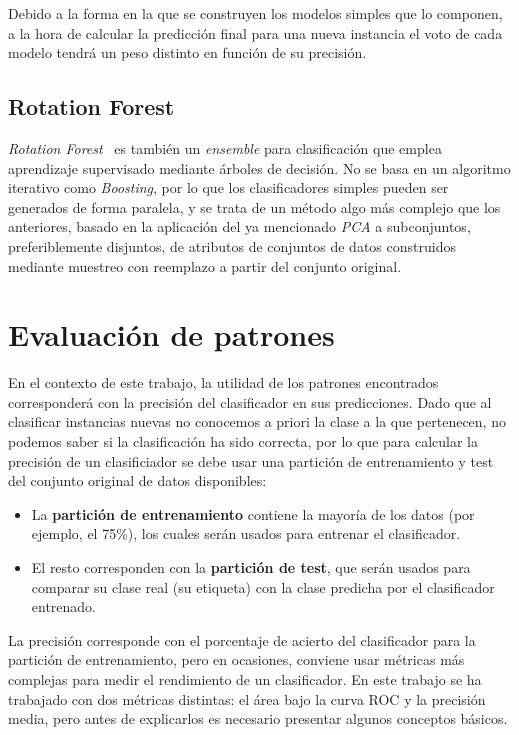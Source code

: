 Debido a la forma en la que se construyen los modelos simples que lo componen, a la hora de calcular la predicción final para una nueva instancia el voto de cada modelo tendrá un peso distinto en función de su precisión.  

\subsection{Rotation Forest}

\textit{Rotation Forest}~\cite{rodriguez2006rotation} es también un \textit{ensemble} para clasificación que emplea aprendizaje supervisado mediante árboles de decisión. No se basa en un algoritmo iterativo como \textit{Boosting}, por lo que los clasificadores simples pueden ser generados de forma paralela, y se trata de un método algo más complejo que los anteriores, basado en la aplicación del ya mencionado \textit{PCA} a subconjuntos, preferiblemente disjuntos, de atributos de conjuntos de datos construidos mediante muestreo con reemplazo a partir del conjunto original. 

\section{Evaluación de patrones}

En el contexto de este trabajo, la utilidad de los patrones encontrados corresponderá con la precisión del clasificador en sus predicciones. Dado que al clasificar instancias nuevas no conocemos a priori la clase a la que pertenecen, no podemos saber si la clasificación ha sido correcta, por lo que para calcular la precisión de un clasificiador se debe usar una partición de entrenamiento y test del conjunto original de datos disponibles:  
\begin{itemize}
	\item La \textbf{partición de entrenamiento} contiene la mayoría de los datos (por ejemplo, el 75\%), los cuales serán usados para entrenar el clasificador. 
	\item El resto corresponden con la \textbf{partición de test}, que serán usados para comparar su clase real (su etiqueta) con la clase predicha por el clasificador entrenado.
\end{itemize} 

La precisión corresponde con el porcentaje de acierto del clasificador para la partición de entrenamiento, pero en ocasiones, conviene usar métricas más complejas para medir el rendimiento de un clasificador. En este trabajo se ha trabajado con dos métricas distintas: el área bajo la curva ROC y la precisión media, pero antes de explicarlos es necesario presentar algunos conceptos básicos.  

